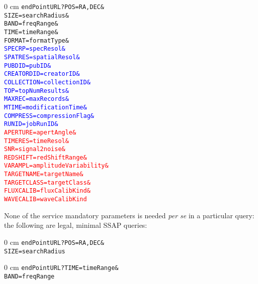 	\begin{adjustwidth}{\parindent}{0 cm}
		\noindent\texttt{endPointURL?POS=RA,DEC\&\\
				SIZE=searchRadius\&\\
				BAND=freqRange\&\\
				TIME=timeRange\&\\
				FORMAT=formatType\&\\
				\textcolor{blue}{SPECRP=specResol\&}\\
				\textcolor{blue}{SPATRES=spatialResol\&}\\
				\textcolor{blue}{PUBDID=pubID\&}\\
				\textcolor{blue}{CREATORDID=creatorID\&}\\
				\textcolor{blue}{COLLECTION=collectionID\&}\\
				\textcolor{blue}{TOP=topNumResults\&}\\
				\textcolor{blue}{MAXREC=maxRecords\&}\\
				\textcolor{blue}{MTIME=modificationTime\&}\\
				\textcolor{blue}{COMPRESS=compressionFlag\&}\\
				\textcolor{blue}{RUNID=jobRunID\&}\\
				\textcolor{red}{APERTURE=apertAngle\&}\\
				\textcolor{red}{TIMERES=timeResol\&}\\
				\textcolor{red}{SNR=signal2noise\&}\\
				\textcolor{red}{REDSHIFT=redShiftRange\&}\\
				\textcolor{red}{VARAMPL=amplitudeVariability\&}\\
				\textcolor{red}{TARGETNAME=targetName\&}\\
				\textcolor{red}{TARGETCLASS=targetClass\&}\\
				\textcolor{red}{FLUXCALIB=fluxCalibKind\&}\\
				\textcolor{red}{WAVECALIB=waveCalibKind}}
	\end{adjustwidth}
	
	None of the service mandatory parameters is needed \emph{per se} 
	in a particular query: the following are legal, minimal SSAP 
	queries:
	
	\begin{adjustwidth}{\parindent}{0 cm}
		\noindent\texttt{endPointURL?POS=RA,DEC\&\\
				SIZE=searchRadius}
	\end{adjustwidth}
	
	\begin{adjustwidth}{\parindent}{0 cm}
		\noindent\texttt{endPointURL?TIME=timeRange\&\\
				BAND=freqRange}		
	\end{adjustwidth}
	
